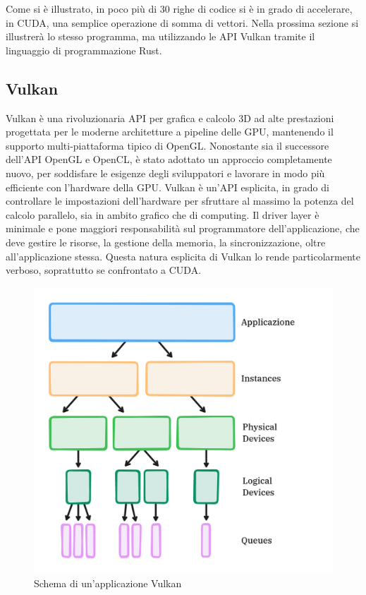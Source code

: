 Come si è illustrato, in poco più di 30 righe di codice si è in grado di accelerare, in CUDA, una semplice operazione di somma di vettori. Nella prossima sezione si illustrerà lo stesso programma, ma utilizzando le API Vulkan tramite il linguaggio di programmazione Rust.

\subsection[Vulkan]{Vulkan}

Vulkan è una rivoluzionaria API per grafica e calcolo 3D ad alte prestazioni progettata per le moderne architetture a pipeline delle GPU, mantenendo il supporto multi-piattaforma tipico di OpenGL. Nonostante sia il successore dell'API OpenGL e OpenCL, è stato adottato un approccio completamente nuovo, per soddisfare le esigenze degli sviluppatori e lavorare in modo più efficiente con l'hardware della GPU. Vulkan è un'API esplicita, in grado di controllare le impostazioni dell'hardware per sfruttare al massimo la potenza del calcolo parallelo, sia in ambito grafico che di computing. Il driver layer è minimale e pone maggiori responsabilità sul programmatore dell'applicazione, che deve gestire le risorse, la gestione della memoria, la sincronizzazione, oltre all'applicazione stessa. Questa natura esplicita di Vulkan lo rende particolarmente verboso, soprattutto se confrontato a CUDA.

\begin{figure}[ht]
    \centering
    \includegraphics[width=.9\linewidth]{images/chapter2/vulkan_scheme.png}
    \caption{Schema di un'applicazione Vulkan}
    \label{fig:vulkan_scheme}
\end{figure}

